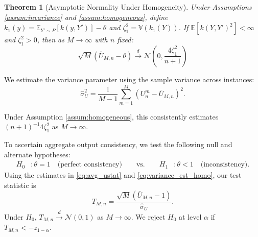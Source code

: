 \documentclass{article}
\theoremstyle{plain}
\newtheorem{theorem}{Theorem}
\theoremstyle{definition}
\theoremstyle{remark}
\begin{document}
\begin{theorem}[Asymptotic Normality Under Homogeneity]
\label{thm:homogeneous}
Under Assumptions \ref{assum:invariance} and \ref{assum:homogeneous}, define $k_1(y) = \mathbb E_{Y' \sim P}[k(y, Y')] - \theta$ and $\zeta_1^2 = \mathbb V(k_1(Y))$. If $\mathbb E[k(Y, Y')^2] < \infty$ and $\zeta_1^2 > 0$, then as $M \to \infty$ with $n$ fixed:
\begin{equation}
    \sqrt{M}(\bar{U}_{M,n} - \theta) \xrightarrow{d} \mathcal{N}\left(0, \frac{4\zeta_1^2}{n+1}\right)
\end{equation}
\end{theorem}



We estimate the variance parameter using the sample variance across instances:
\begin{equation}
    \hat{\sigma}_U^2 = \frac{1}{M-1}\sum_{m=1}^M \left(U_n^m - \bar{U}_{M,n}\right)^2.
    \label{eq:variance_est_homo}
\end{equation}

Under Assumption \ref{assum:homogeneous}, this consistently estimates $(n+1)^{-1} 4\zeta_1^2$ as $M \to \infty$.

To ascertain aggregate output consistency, we test the following null and alternate hypotheses:
\begin{align}
    H_0&: \theta = 1 \quad\text{(perfect consistency)} \qquad \text{vs.} \qquad
    H_1&: \theta < 1 \quad\text{(inconsistency)}.
\end{align}
%
Using the estimates in \eqref{eq:avg_ustat} and \eqref{eq:variance_est_homo}, our test statistic is
%
\begin{equation}
    T_{M,n} = \frac{\sqrt{M}(\bar{U}_{M,n} - 1)}{\hat{\sigma}_U}.
    \label{eq:test_stat_homo}
\end{equation}
%
Under $H_0$, $T_{M,n} \xrightarrow{d} \mathcal{N}(0, 1)$ as $M \to \infty$. We reject $H_0$ at level $\alpha$ if $T_{M,n} < -z_{1-\alpha}$.
\end{document}
